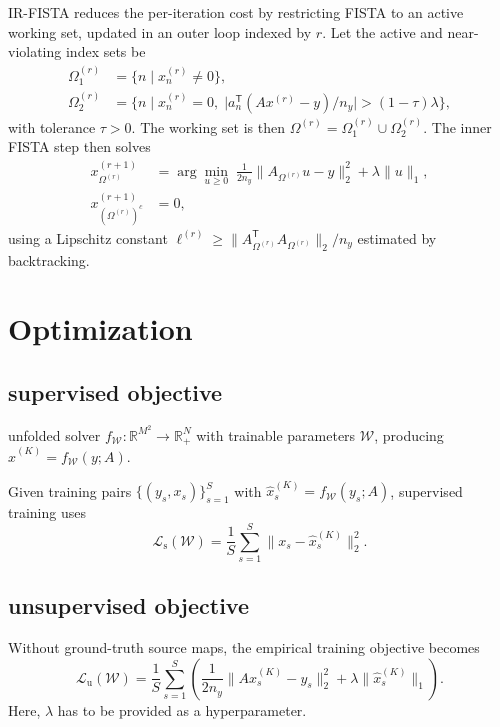 \documentclass[peer-review]{fa2026}
\begin{document}
IR-FISTA reduces the per-iteration cost by restricting FISTA to an active working set, updated in an outer loop indexed by $r$.
Let the active and near-violating index sets be
\begin{align}
    \Omega_1^{(r)} &= \bigl\{n \mid x_n^{(r)} \neq 0\bigr\}, \\
    \Omega_2^{(r)} &= \bigl\{n \mid x_n^{(r)}=0,\;
    \bigl|a_n^\mathsf{T}(Ax^{(r)}-y)/n_y\bigr| > (1-\tau)\lambda\bigr\},
\end{align}
with tolerance $\tau>0$. The working set is then $\Omega^{(r)} = \Omega_1^{(r)} \cup \Omega_2^{(r)}$.
The inner FISTA step then solves
\begin{equation}
\begin{split}
    x_{\Omega^{(r)}}^{(r+1)} &=
    \arg\min_{u \geq 0} \;
    \frac{1}{2n_y}\|A_{\Omega^{(r)}}u-y\|_2^2 + \lambda\|u\|_1, \\
    x_{(\Omega^{(r)})^c}^{(r+1)} &= 0,
\end{split}
\end{equation}
using a Lipschitz constant
$\ell^{(r)} \geq \|A_{\Omega^{(r)}}^\mathsf{T}A_{\Omega^{(r)}}\|_2/n_y$
estimated by backtracking.

\section{Optimization}\label{sec:optimization}

\subsection{supervised objective}

unfolded solver $f_\mathcal{W} : \mathbb{R}^{M^2} \to \mathbb{R}_+^{N}$ with trainable parameters $\mathcal{W}$, producing
$\hat{x}^{(K)} = f_{\mathcal W}(y;A)$.



Given training pairs $\{(y_s,x_s)\}_{s=1}^{S}$ with
$\hat{x}_s^{(K)} = f_{\mathcal W}(y_s;A)$, supervised training uses
\begin{equation}
    \mathcal{L}_{\mathrm{s}}(\mathcal{W}) =
    \frac{1}{S}\sum_{s=1}^{S}\|x_s - \hat{x}_s^{(K)}\|_2^2 .
\end{equation}

\subsection{unsupervised objective}

Without ground-truth source maps, the empirical training objective becomes
\begin{equation}
    \mathcal{L}_{\mathrm{u}}(\mathcal{W}) =
    \frac{1}{S}\sum_{s=1}^{S}
    \left(
    \frac{1}{2n_y}\|A \hat{x}_s^{(K)} - y_s\|_2^2
    + \lambda \|\hat{x}_s^{(K)}\|_1
    \right).
\end{equation}
Here, $\lambda$ has to be provided as a hyperparameter.\\
\end{document}
